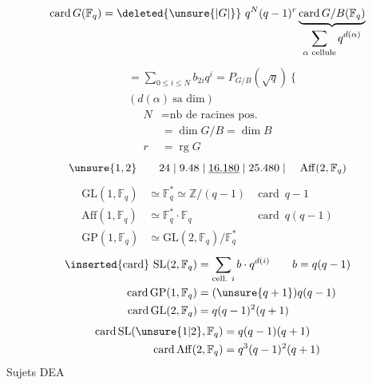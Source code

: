 \[\operatorname{card}G(\mathbb F_q)=\deleted{\unsure{\lvert G\rvert}}\ q^N(q-1)^r\underbrace{\operatorname{card}G/B(\mathbb F_q)}_{\displaystyle\sum_{\alpha\text{ cellule}}q^{d(\alpha)}}\]
\[\begin{aligned}{}&=\sum_{0\leq i\leq N}b_{2i}q^i=P_{G/B}(\sqrt q)\ \Bigg\{\\[-2pt]&(d(\alpha)\ \text{sa dim})\end{aligned}\]
\[\begin{aligned}N&=\text{nb de racines pos.}\\&=\dim G/B=\dim B\\r&=\operatorname{rg}G\end{aligned}\]
\[\unsure{1,2}\qquad 24\mid9.48\mid\underline{16.180}\mid25.480\mid\quad\mathrm{Aff}(2,\mathbb F_q)\]
\[\begin{aligned}\mathrm{GL}(1,\mathbb F_q)&\simeq\mathbb F_q^*\simeq\mathbb Z/(q-1)&\operatorname{card}\ q-1\\ \mathrm{Aff}(1,\mathbb F_q)&\simeq\mathbb F_q^*\cdot\mathbb F_q&\operatorname{card}\ q(q-1)\\ \mathrm{GP}(1,\mathbb F_q)&\simeq\mathrm{GL}(2,\mathbb F_q)/\mathbb F_q^*\end{aligned}\]
\[\begin{aligned}\inserted{\text{card}}\ \mathrm{SL}(2,\mathbb F_q)&=\sum_{\text{cell. }i}b\cdot q^{d(i)}\qquad b=q(q-1)\\ \operatorname{card}\mathrm{GP}(1,\mathbb F_q)&=(\unsure{q+1})q(q-1)\\ \operatorname{card}\mathrm{GL}(2,\mathbb F_q)&=q(q-1)^2(q+1)\end{aligned}\]
\[\begin{aligned}\operatorname{card}\mathrm{SL}(\unsure{1|2},\mathbb F_q)&=q(q-1)(q+1)\\ \operatorname{card}\mathrm{Aff}(2,\mathbb F_q)&=q^3(q-1)^2(q+1)\end{aligned}\]
Sujets DEA

